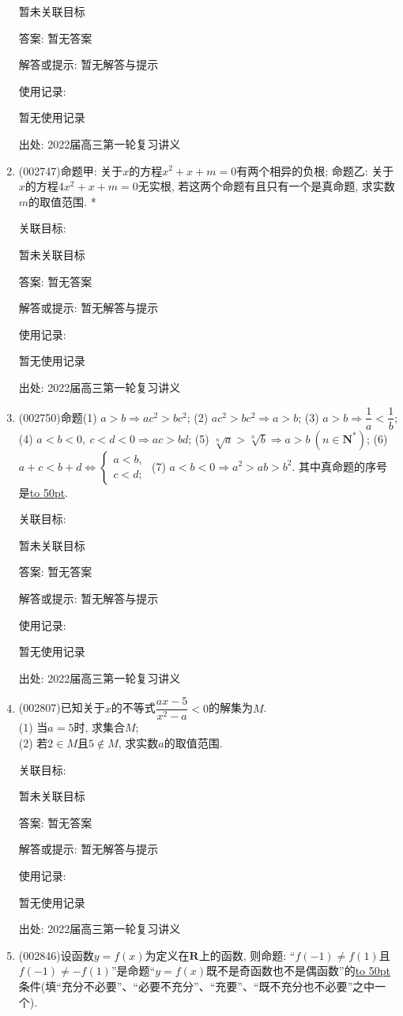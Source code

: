 \documentclass[10pt,a4paper]{article}
\newcommand{\blank}[1]{\underline{\hbox to #1pt{}}}
\begin{document}
\begin{enumerate}[1.]
暂未关联目标

答案: 暂无答案

解答或提示: 暂无解答与提示

使用记录:

暂无使用记录


出处: 2022届高三第一轮复习讲义
\item { (002747)}命题甲: 关于$x$的方程$x^2+x+m=0$有两个相异的负根; 命题乙: 关于$x$的方程$4x^2+x+m=0$无实根, 若这两个命题有且只有一个是真命题, 求实数$m$的取值范围.
*


关联目标:

暂未关联目标

答案: 暂无答案

解答或提示: 暂无解答与提示

使用记录:

暂无使用记录


出处: 2022届高三第一轮复习讲义
\item { (002750)}命题(1) $a>b\Rightarrow ac^2>bc^2$;   (2) $ac^2>bc^2\Rightarrow a>b$;     (3) $a>b\Rightarrow \dfrac 1a<\dfrac 1b$; (4) $a<b<0, \ c<d<0\Rightarrow ac>bd$;   (5) $\sqrt[n]a>\sqrt[n]b\Rightarrow a>b \ (n\in \mathbf{N}^*)$;    (6) $a+c<b+d\Leftrightarrow \begin{cases} a<b, \\ c<d; \end{cases}$ (7) $a<b<0\Rightarrow a^2>ab>b^2$. 其中真命题的序号是\blank{50}.


关联目标:

暂未关联目标

答案: 暂无答案

解答或提示: 暂无解答与提示

使用记录:

暂无使用记录


出处: 2022届高三第一轮复习讲义
\item { (002807)}已知关于$x$的不等式$\dfrac{ax-5}{x^2-a}<0$的解集为$M$.\\
(1) 当$a=5$时, 求集合$M$;\\
(2) 若$2\in M$且$5\notin M$, 求实数$a$的取值范围.


关联目标:

暂未关联目标

答案: 暂无答案

解答或提示: 暂无解答与提示

使用记录:

暂无使用记录


出处: 2022届高三第一轮复习讲义
\item { (002846)}设函数$y=f(x)$为定义在$\mathbf{R}$上的函数, 则命题: ``$f(-1)\ne f(1)$且$f(-1)\ne -f(1)$''是命题``$y=f(x)$既不是奇函数也不是偶函数''的\blank{50}条件(填``充分不必要''、``必要不充分''、``充要''、``既不充分也不必要''之中一个).



\end{enumerate}
\end{document}
